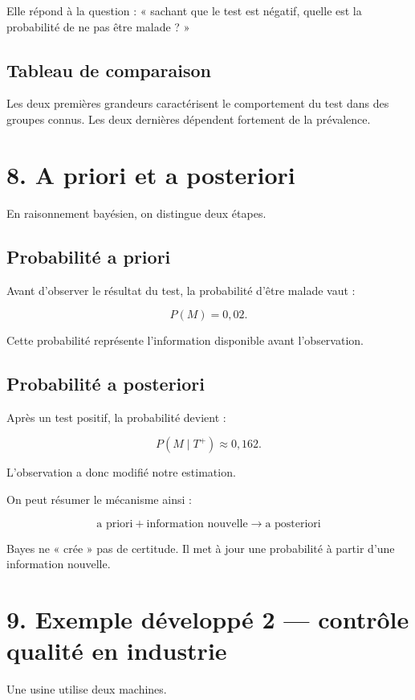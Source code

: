 Elle répond à la question : « sachant que le test est négatif, quelle est la probabilité de ne pas être malade ? »

\subsection{Tableau de comparaison}


Les deux premières grandeurs caractérisent le comportement du test dans des groupes connus.  
Les deux dernières dépendent fortement de la prévalence.


\section{8. A priori et a posteriori}

En raisonnement bayésien, on distingue deux étapes.

\subsection{Probabilité a priori}

Avant d'observer le résultat du test, la probabilité d'être malade vaut :

\[
P(M)=0{,}02.
\]

Cette probabilité représente l'information disponible avant l'observation.

\subsection{Probabilité a posteriori}

Après un test positif, la probabilité devient :

\[
P(M\mid T^+)\approx0{,}162.
\]

L'observation a donc modifié notre estimation.

On peut résumer le mécanisme ainsi :

\[
\boxed{
\text{a priori}
+
\text{information nouvelle}
\longrightarrow
\text{a posteriori}
}
\]

Bayes ne « crée » pas de certitude. Il met à jour une probabilité à partir d'une information nouvelle.


\section{9. Exemple développé 2 — contrôle qualité en industrie}

Une usine utilise deux machines.

